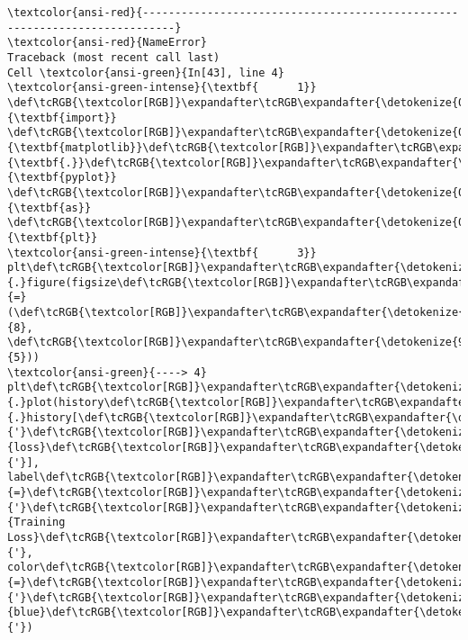 \documentclass[11pt]{article}
\begin{document}
    \begin{Verbatim}[commandchars=\\\{\}, frame=single, framerule=2mm, rulecolor=\color{outerrorbackground}]
\textcolor{ansi-red}{---------------------------------------------------------------------------}
\textcolor{ansi-red}{NameError}                                 Traceback (most recent call last)
Cell \textcolor{ansi-green}{In[43], line 4}
\textcolor{ansi-green-intense}{\textbf{      1}} \def\tcRGB{\textcolor[RGB]}\expandafter\tcRGB\expandafter{\detokenize{0,135,0}}{\textbf{import}} \def\tcRGB{\textcolor[RGB]}\expandafter\tcRGB\expandafter{\detokenize{0,0,255}}{\textbf{matplotlib}}\def\tcRGB{\textcolor[RGB]}\expandafter\tcRGB\expandafter{\detokenize{0,0,255}}{\textbf{.}}\def\tcRGB{\textcolor[RGB]}\expandafter\tcRGB\expandafter{\detokenize{0,0,255}}{\textbf{pyplot}} \def\tcRGB{\textcolor[RGB]}\expandafter\tcRGB\expandafter{\detokenize{0,135,0}}{\textbf{as}} \def\tcRGB{\textcolor[RGB]}\expandafter\tcRGB\expandafter{\detokenize{0,0,255}}{\textbf{plt}}
\textcolor{ansi-green-intense}{\textbf{      3}} plt\def\tcRGB{\textcolor[RGB]}\expandafter\tcRGB\expandafter{\detokenize{98,98,98}}{.}figure(figsize\def\tcRGB{\textcolor[RGB]}\expandafter\tcRGB\expandafter{\detokenize{98,98,98}}{=}(\def\tcRGB{\textcolor[RGB]}\expandafter\tcRGB\expandafter{\detokenize{98,98,98}}{8}, \def\tcRGB{\textcolor[RGB]}\expandafter\tcRGB\expandafter{\detokenize{98,98,98}}{5}))
\textcolor{ansi-green}{----> 4} plt\def\tcRGB{\textcolor[RGB]}\expandafter\tcRGB\expandafter{\detokenize{98,98,98}}{.}plot(history\def\tcRGB{\textcolor[RGB]}\expandafter\tcRGB\expandafter{\detokenize{98,98,98}}{.}history[\def\tcRGB{\textcolor[RGB]}\expandafter\tcRGB\expandafter{\detokenize{175,0,0}}{'}\def\tcRGB{\textcolor[RGB]}\expandafter\tcRGB\expandafter{\detokenize{175,0,0}}{loss}\def\tcRGB{\textcolor[RGB]}\expandafter\tcRGB\expandafter{\detokenize{175,0,0}}{'}], label\def\tcRGB{\textcolor[RGB]}\expandafter\tcRGB\expandafter{\detokenize{98,98,98}}{=}\def\tcRGB{\textcolor[RGB]}\expandafter\tcRGB\expandafter{\detokenize{175,0,0}}{'}\def\tcRGB{\textcolor[RGB]}\expandafter\tcRGB\expandafter{\detokenize{175,0,0}}{Training Loss}\def\tcRGB{\textcolor[RGB]}\expandafter\tcRGB\expandafter{\detokenize{175,0,0}}{'}, color\def\tcRGB{\textcolor[RGB]}\expandafter\tcRGB\expandafter{\detokenize{98,98,98}}{=}\def\tcRGB{\textcolor[RGB]}\expandafter\tcRGB\expandafter{\detokenize{175,0,0}}{'}\def\tcRGB{\textcolor[RGB]}\expandafter\tcRGB\expandafter{\detokenize{175,0,0}}{blue}\def\tcRGB{\textcolor[RGB]}\expandafter\tcRGB\expandafter{\detokenize{175,0,0}}{'})

\end{Verbatim}
\end{document}
